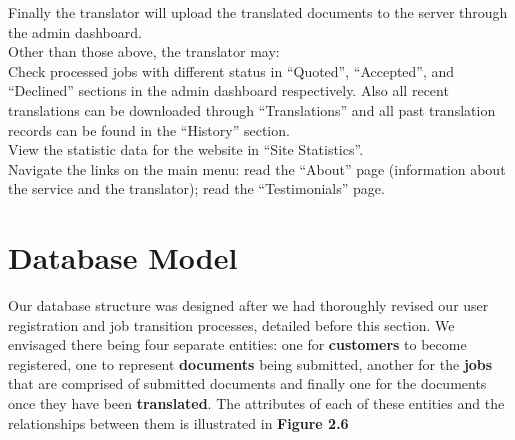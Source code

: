\documentclass{l3proj}
\begin{document}
Finally the translator will upload the translated documents to the server
through the admin dashboard.\\

Other than those above, the translator may: \\

Check processed jobs with different status in “Quoted”, “Accepted”, and
“Declined” sections in the admin dashboard respectively. Also all recent
translations can be downloaded through “Translations” and all past translation
records can be found in the “History” section.\\

View the statistic data for the website in “Site Statistics”.\\

	Navigate the links on the main menu: read the “About” page (information
about the service and the translator); read the “Testimonials” page.\\


\newpage

\section{Database Model}

Our database structure was designed after we had thoroughly revised our user
registration and job transition 
processes, detailed before this section. We envisaged there being four separate
entities: one for \textbf{customers} to become 
registered, one to represent \textbf{documents} being submitted, another for the
\textbf{jobs} that are comprised 
of submitted documents and finally one for the documents once they have been
\textbf{translated}. 
The attributes of each of these entities and the relationships between them is
illustrated in \textbf{Figure 2.6} 
\end{document}
